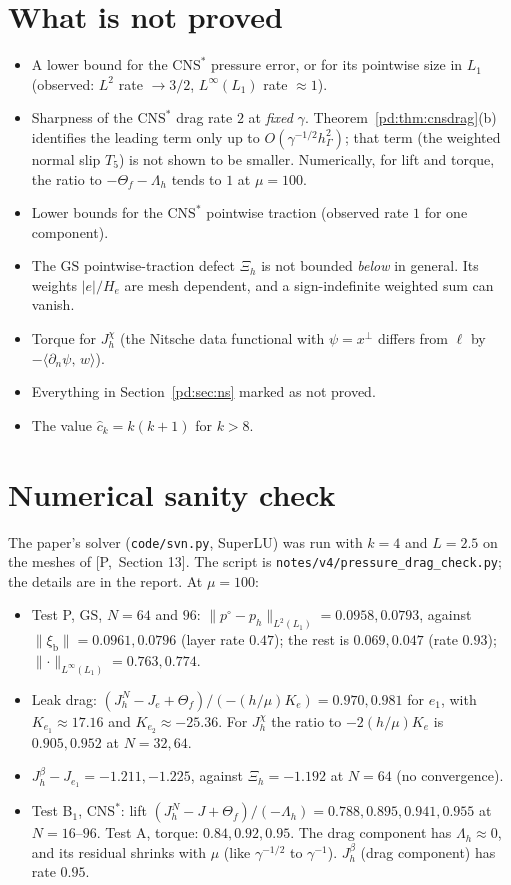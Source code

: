 \documentclass[11pt,reqno]{amsart}
\theoremstyle{plain}
\theoremstyle{definition}
\newcommand{\hG}{h_\Gamma}
\newcommand{\dn}{\partial_n}
\newcommand{\ip}[2]{\langle #1,\, #2\rangle}
\newcommand{\norm}[1]{\lVert #1\rVert}
\newcommand{\GS}{\mathrm{GS}}
\newcommand{\CNS}{\mathrm{CNS}^\ast}
\newcommand{\Pref}[1]{\textup{[P,~#1]}}
\newcommand{\Lay}{L_1}
\newcommand{\xib}{\xi_{\mathrm b}}
\newcommand{\chat}{\hat c_k}
\begin{document}
\section{What is not proved}\label{pd:sec:notproved}
\begin{itemize}
\item A lower bound for the $\CNS$ pressure error, or for its pointwise size in $\Lay$ (observed: $L^2$ rate $\to3/2$, $L^\infty(\Lay)$ rate $\approx1$).
\item Sharpness of the $\CNS$ drag rate $2$ at \emph{fixed} $\gamma$. Theorem~\ref{pd:thm:cnsdrag}(b) identifies the leading term only up to $O(\gamma^{-1/2}\hG^2)$; that term (the weighted normal slip $T_5$) is not shown to be smaller. Numerically, for lift and torque, the ratio to $-\Theta_f-\Lambda_h$ tends to $1$ at $\mu=100$.
\item Lower bounds for the $\CNS$ pointwise traction (observed rate $1$ for one component).
\item The $\GS$ pointwise-traction defect $\Xi_h$ is not bounded \emph{below} in general. Its weights $|e|/H_e$ are mesh dependent, and a sign-indefinite weighted sum can vanish.
\item Torque for $J^\chi_h$ (the Nitsche data functional with $\psi=x^\perp$ differs from $\ell$ by $-\ip{\dn\psi}w$).
\item Everything in Section~\ref{pd:sec:ns} marked as not proved.
\item The value $\chat=k(k+1)$ for $k>8$.
\end{itemize}

\section{Numerical sanity check}\label{pd:sec:num}
The paper's solver (\texttt{code/svn.py}, SuperLU) was run with $k=4$ and $L=2.5$ on the meshes of \Pref{Section 13}. The script is \texttt{notes/v4/pressure\_drag\_check.py}; the details are in the report. At $\mu=100$:
\begin{itemize}
\item Test P, $\GS$, $N=64$ and $96$: $\norm{p^\circ-p_h}_{L^2(\Lay)}=0.0958,0.0793$, against $\norm\xib=0.0961,0.0796$ (layer rate $0.47$); the rest is $0.069,0.047$ (rate $0.93$); $\norm\cdot_{L^\infty(\Lay)}=0.763,0.774$.
\item Leak drag: $(J^N_h-J_e+\Theta_f)/(-(h/\mu)K_e)=0.970,0.981$ for $e_1$, with $K_{e_1}\approx17.16$ and $K_{e_2}\approx-25.36$. For $J^\chi_h$ the ratio to $-2(h/\mu)K_e$ is $0.905,0.952$ at $N=32,64$.
\item $J^\beta_h-J_{e_1}=-1.211,-1.225$, against $\Xi_h=-1.192$ at $N=64$ (no convergence).
\item Test B$_1$, $\CNS$: lift $(J^N_h-J+\Theta_f)/(-\Lambda_h)=0.788,0.895,0.941,0.955$ at $N=16$--$96$. Test A, torque: $0.84,0.92,0.95$. The drag component has $\Lambda_h\approx0$, and its residual shrinks with $\mu$ (like $\gamma^{-1/2}$ to $\gamma^{-1}$). $J^\beta_h$ (drag component) has rate $0.95$.
\end{itemize}
\end{document}
